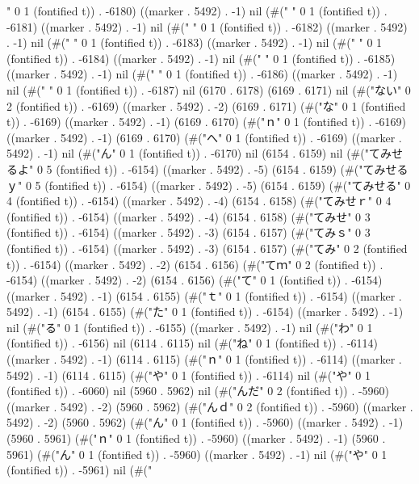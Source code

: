 " 0 1 (fontified t)) . -6180) ((marker . 5492) . -1) nil (#("	" 0 1 (fontified t)) . -6181) ((marker . 5492) . -1) nil (#("	" 0 1 (fontified t)) . -6182) ((marker . 5492) . -1) nil (#(" " 0 1 (fontified t)) . -6183) ((marker . 5492) . -1) nil (#(" " 0 1 (fontified t)) . -6184) ((marker . 5492) . -1) nil (#(" " 0 1 (fontified t)) . -6185) ((marker . 5492) . -1) nil (#(" " 0 1 (fontified t)) . -6186) ((marker . 5492) . -1) nil (#(" " 0 1 (fontified t)) . -6187) nil (6170 . 6178) (6169 . 6171) nil (#("ない" 0 2 (fontified t)) . -6169) ((marker . 5492) . -2) (6169 . 6171) (#("な" 0 1 (fontified t)) . -6169) ((marker . 5492) . -1) (6169 . 6170) (#("ｎ" 0 1 (fontified t)) . -6169) ((marker . 5492) . -1) (6169 . 6170) (#("へ" 0 1 (fontified t)) . -6169) ((marker . 5492) . -1) nil (#("ん" 0 1 (fontified t)) . -6170) nil (6154 . 6159) nil (#("てみせるよ" 0 5 (fontified t)) . -6154) ((marker . 5492) . -5) (6154 . 6159) (#("てみせるｙ" 0 5 (fontified t)) . -6154) ((marker . 5492) . -5) (6154 . 6159) (#("てみせる" 0 4 (fontified t)) . -6154) ((marker . 5492) . -4) (6154 . 6158) (#("てみせｒ" 0 4 (fontified t)) . -6154) ((marker . 5492) . -4) (6154 . 6158) (#("てみせ" 0 3 (fontified t)) . -6154) ((marker . 5492) . -3) (6154 . 6157) (#("てみｓ" 0 3 (fontified t)) . -6154) ((marker . 5492) . -3) (6154 . 6157) (#("てみ" 0 2 (fontified t)) . -6154) ((marker . 5492) . -2) (6154 . 6156) (#("てｍ" 0 2 (fontified t)) . -6154) ((marker . 5492) . -2) (6154 . 6156) (#("て" 0 1 (fontified t)) . -6154) ((marker . 5492) . -1) (6154 . 6155) (#("ｔ" 0 1 (fontified t)) . -6154) ((marker . 5492) . -1) (6154 . 6155) (#("た" 0 1 (fontified t)) . -6154) ((marker . 5492) . -1) nil (#("る" 0 1 (fontified t)) . -6155) ((marker . 5492) . -1) nil (#("わ" 0 1 (fontified t)) . -6156) nil (6114 . 6115) nil (#("ね" 0 1 (fontified t)) . -6114) ((marker . 5492) . -1) (6114 . 6115) (#("ｎ" 0 1 (fontified t)) . -6114) ((marker . 5492) . -1) (6114 . 6115) (#("や" 0 1 (fontified t)) . -6114) nil (#("や" 0 1 (fontified t)) . -6060) nil (5960 . 5962) nil (#("んだ" 0 2 (fontified t)) . -5960) ((marker . 5492) . -2) (5960 . 5962) (#("んｄ" 0 2 (fontified t)) . -5960) ((marker . 5492) . -2) (5960 . 5962) (#("ん" 0 1 (fontified t)) . -5960) ((marker . 5492) . -1) (5960 . 5961) (#("ｎ" 0 1 (fontified t)) . -5960) ((marker . 5492) . -1) (5960 . 5961) (#("ん" 0 1 (fontified t)) . -5960) ((marker . 5492) . -1) nil (#("や" 0 1 (fontified t)) . -5961) nil (#("
